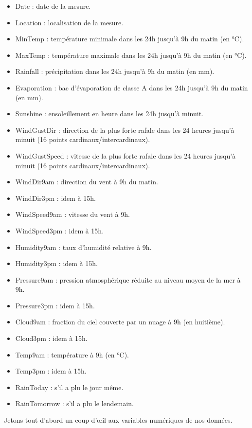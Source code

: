 \documentclass{article}
\begin{document}
\begin{itemize}
    \item Date : date de la mesure.
    \item Location : localisation de la mesure.
    \item MinTemp : température minimale dans les 24h jusqu'à 9h du matin (en °C).
    \item MaxTemp : température maximale dans les 24h jusqu'à 9h du matin (en °C).
    \item Rainfall : précipitation dans les 24h jusqu'à 9h du matin (en mm).
    \item Evaporation : bac d'évaporation de classe A dans les 24h jusqu'à 9h du matin (en mm).
    \item Sunshine : ensoleillement en heure dans les 24h jusqu'à minuit.
    \item WindGustDir : direction de la plus forte rafale dans les 24 heures jusqu'à minuit (16 points cardinaux/intercardinaux).   
    \item WindGustSpeed : vitesse de la plus forte rafale dans les 24 heures jusqu'à minuit (16 points cardinaux/intercardinaux).
    \item WindDir9am : direction du vent à 9h du matin.
    \item WindDir3pm : idem à 15h.
    \item WindSpeed9am : vitesse du vent à 9h.
    \item WindSpeed3pm : idem à 15h.
    \item Humidity9am : taux d'humidité relative à 9h.
    \item Humidity3pm : idem à 15h.
    \item Pressure9am : pression atmosphérique réduite au niveau moyen de la mer à 9h.
    \item Pressure3pm : idem à 15h.
    \item Cloud9am : fraction du ciel couverte par un nuage à 9h (en huitième).   
    \item Cloud3pm : idem à 15h.
    \item Temp9am : température à 9h (en °C).
    \item Temp3pm : idem à 15h.
    \item RainToday : s'il a plu le jour même.
    \item RainTomorrow : s'il a plu le lendemain.   
\end{itemize}

Jetons tout d'abord un coup d'œil aux variables numériques de nos données. 
\end{document}
